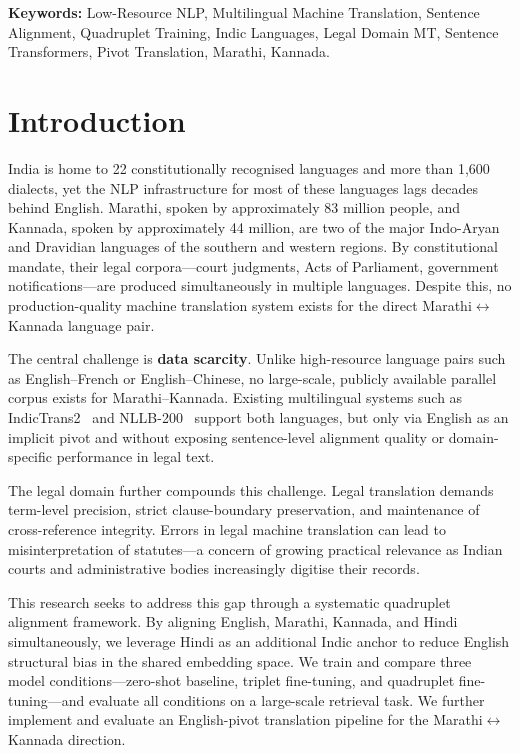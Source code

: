 \documentclass[conference,letterpaper]{IEEEtran}
\begin{document}
\textbf{Keywords:} Low-Resource NLP, Multilingual Machine Translation,
Sentence Alignment, Quadruplet Training, Indic Languages, Legal Domain MT,
Sentence Transformers, Pivot Translation, Marathi, Kannada.


\section{Introduction}

India is home to 22 constitutionally recognised languages and more than
1,600 dialects, yet the NLP infrastructure for most of these languages
lags decades behind English. Marathi, spoken by approximately 83 million
people, and Kannada, spoken by approximately 44 million, are two of the
major Indo-Aryan and Dravidian languages of the southern and western
regions. By constitutional mandate, their legal corpora---court judgments,
Acts of Parliament, government notifications---are produced simultaneously
in multiple languages. Despite this, no production-quality machine
translation system exists for the direct Marathi$\leftrightarrow$Kannada
language pair.

The central challenge is \textbf{data scarcity}. Unlike high-resource
language pairs such as English--French or English--Chinese, no large-scale,
publicly available parallel corpus exists for Marathi--Kannada. Existing
multilingual systems such as IndicTrans2~\cite{gala2023indictrans2} and
NLLB-200~\cite{nllb2022} support both languages, but only via English as an
implicit pivot and without exposing sentence-level alignment quality or
domain-specific performance in legal text.

The legal domain further compounds this challenge. Legal translation demands
term-level precision, strict clause-boundary preservation, and maintenance
of cross-reference integrity. Errors in legal machine translation can lead to
misinterpretation of statutes---a concern of growing practical relevance as
Indian courts and administrative bodies increasingly digitise their records.

This research seeks to address this gap through a systematic quadruplet
alignment framework. By aligning English, Marathi, Kannada, and Hindi
simultaneously, we leverage Hindi as an additional Indic anchor to reduce
English structural bias in the shared embedding space. We train and compare
three model conditions---zero-shot baseline, triplet fine-tuning, and
quadruplet fine-tuning---and evaluate all conditions on a large-scale
retrieval task. We further implement and evaluate an English-pivot translation
pipeline for the Marathi$\leftrightarrow$Kannada direction.
\end{document}
